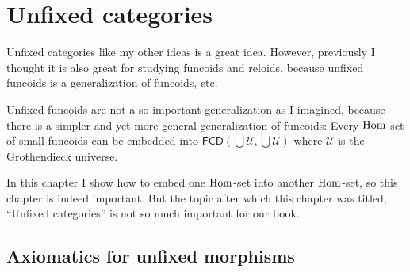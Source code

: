 \chapter{Unfixed categories}


Unfixed categories like my other ideas is a great idea.
However, previously I thought it is also great for studying
funcoids and reloids, because unfixed funcoids is a
generalization of funcoids, etc.

Unfixed funcoids are not a so important generalization as I
imagined, because there is a simpler and yet more general
generalization of funcoids: Every $\operatorname{Hom}$-set of small funcoids
can be embedded into $\mathsf{FCD}\left(\bigcup\mathscr{U},\bigcup\mathscr{U}\right)$ where $\mathscr{U}$ is the Grothendieck universe.

In this chapter I show how to embed one $\operatorname{Hom}$-set into another
$\operatorname{Hom}$-set, so this chapter is indeed important. But the topic
after which this chapter was titled, ``Unfixed categories'' is
not so much important for our book.

\section{Axiomatics for unfixed morphisms}

